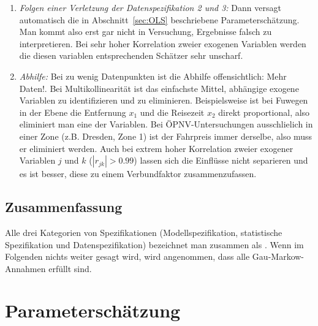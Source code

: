 \begin{enumerate}
\bi
\item \textit{Folgen einer Verletzung der
  Datenspezifikation 2 und 3:}
Dann versagt automatisch die
in Abschnitt~\ref{sec:OLS} beschriebene Parametersch\"atzung. Man
kommt also erst gar nicht in Versuchung, Ergebnisse falsch zu
interpretieren. Bei sehr hoher Korrelation zweier exogenen Variablen
werden die diesen variablen entsprechenden Sch\"atzer sehr unscharf.

\item \emph{Abhilfe:} Bei zu wenig
Datenpunkten ist die Abhilfe 
offensichtlich: Mehr Daten!. Bei Multikollinearit\"at ist das einfachste Mittel,
abh\"angige exogene Variablen zu identifizieren und zu
eliminieren. Beispielsweise ist 
bei Fu\3wegen in der Ebene die Entfernung $x_1$ und die Reisezeit
$x_2$ direkt proportional, also eliminiert man eine der Variablen. Bei
\"OPNV-Untersuchungen ausschlie\3lich in einer Zone (z.B. Dresden,
Zone 1) ist der Fahrpreis immer
derselbe, also muss er eliminiert werden. Auch bei extrem hoher
Korrelation zweier exogener Variablen $j$ und $k$ ($|r_{jk}|>0.99$)
lassen sich die Einfl\"usse nicht separieren und es ist besser, 
diese zu einem Verbundfaktor zusammenzufassen.
\ei
\end{enumerate}




\subsection{\label{sec:gaussMarkow}Zusammenfassung}
Alle drei Kategorien von Spezifikationen (Modellspezifikation,
statistische Spezifikation und Datenspezifikation) bezeichnet man
zusammen als . Wenn im Folgenden nichts
weiter gesagt wird, wird angenommen, dass alle Gau\3-Markow-Annahmen
erf\"ullt sind.



\section{\label{sec:kalib}Parametersch\"atzung}

